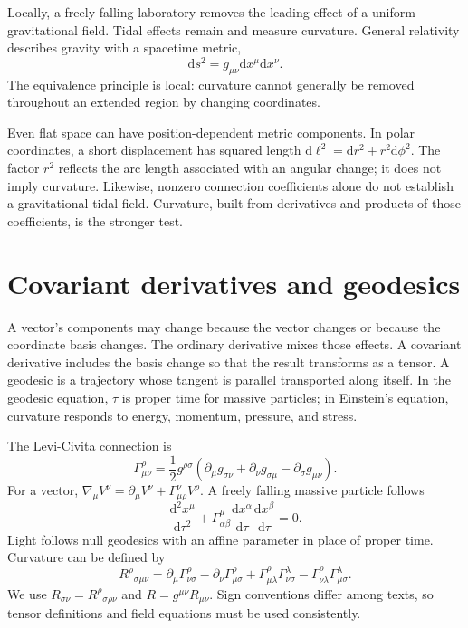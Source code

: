 \documentclass[11pt,oneside]{book}
\newcommand{\dd}{\mathrm{d}}
\theoremstyle{reviewstyle}
\begin{document}
Locally, a freely falling laboratory removes the leading effect of a uniform gravitational field. Tidal effects remain and measure curvature. General relativity describes gravity with a spacetime metric,
\begin{equation}\dd s^2=g_{\mu\nu}\dd x^\mu\dd x^\nu.\end{equation}
The equivalence principle is local: curvature cannot generally be removed throughout an extended region by changing coordinates.

Even flat space can have position-dependent metric components. In polar coordinates, a short displacement has squared length $\dd\ell^2=\dd r^2+r^2\dd\phi^2$. The factor $r^2$ reflects the arc length associated with an angular change; it does not imply curvature. Likewise, nonzero connection coefficients alone do not establish a gravitational tidal field. Curvature, built from derivatives and products of those coefficients, is the stronger test.

\section{Covariant derivatives and geodesics}
A vector's components may change because the vector changes or because the coordinate basis changes. The ordinary derivative mixes those effects. A covariant derivative includes the basis change so that the result transforms as a tensor. A geodesic is a trajectory whose tangent is parallel transported along itself. In the geodesic equation, $\tau$ is proper time for massive particles; in Einstein's equation, curvature responds to energy, momentum, pressure, and stress.

The Levi-Civita connection is
\begin{equation}
\Gamma^\rho_{\mu\nu}=\frac12g^{\rho\sigma}(\partial_\mu g_{\sigma\nu}+\partial_\nu g_{\sigma\mu}-\partial_\sigma g_{\mu\nu}).
\end{equation}
For a vector, $\nabla_\mu V^\nu=\partial_\mu V^\nu+\Gamma^\nu_{\mu\rho}V^\rho$. A freely falling massive particle follows
\begin{equation}\frac{\dd^2x^\mu}{\dd\tau^2}+\Gamma^\mu_{\alpha\beta}\frac{\dd x^\alpha}{\dd\tau}\frac{\dd x^\beta}{\dd\tau}=0.\end{equation}
Light follows null geodesics with an affine parameter in place of proper time. Curvature can be defined by
\begin{equation}
R^\rho{}_{\sigma\mu\nu}=\partial_\mu\Gamma^\rho_{\nu\sigma}-\partial_\nu\Gamma^\rho_{\mu\sigma}
+\Gamma^\rho_{\mu\lambda}\Gamma^\lambda_{\nu\sigma}-\Gamma^\rho_{\nu\lambda}\Gamma^\lambda_{\mu\sigma}.
\end{equation}
We use $R_{\sigma\nu}=R^\rho{}_{\sigma\rho\nu}$ and $R=g^{\mu\nu}R_{\mu\nu}$. Sign conventions differ among texts, so tensor definitions and field equations must be used consistently.
\end{document}
